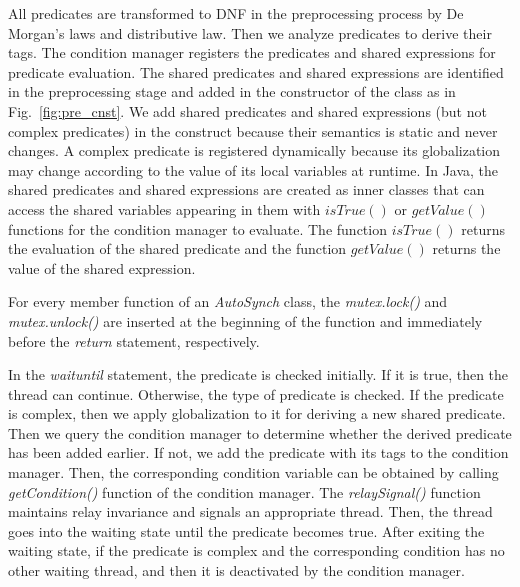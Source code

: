 \documentclass[preprint]{sigplanconf}
\begin{document}
All predicates are transformed to DNF in the preprocessing process by De Morgan's laws and 
distributive law. Then we analyze predicates to derive their tags. The condition 
manager registers the predicates and shared expressions for predicate 
evaluation. 
The shared 
predicates and shared expressions are identified in the preprocessing stage and added 
in the constructor of the class as in Fig.~\ref{fig:pre_cnst}. We add shared
predicates and shared expressions (but not complex predicates) in the construct because their semantics is
static and never changes. A complex predicate is registered dynamically
because its globalization may change according to the value of its local variables at
runtime. In Java, the shared 
predicates and shared expressions are created as inner classes that can access
the shared variables appearing in them with
$isTrue()$ or $getValue()$ functions for the condition manager to evaluate.
The function $isTrue()$ returns the evaluation of the shared predicate and
the function $getValue()$ returns the value of the shared expression.


For every member function of an {\em AutoSynch} class, the {\em mutex.lock()} and
{\em mutex.unlock()} are inserted at the beginning of the function and immediately before
the {\em return} statement, respectively.
%  


In the {\em waituntil} statement, the predicate is checked initially. If 
it is true, then the thread can continue. Otherwise, the type of
predicate is checked. If the predicate is complex, then we apply globalization 
to it for deriving a new shared predicate. Then we query the condition manager 
to determine
whether the derived predicate has been added earlier. If not, we add the 
predicate with its tags to the condition manager. Then, the corresponding 
condition variable can be obtained by calling {\em getCondition()} function of the
condition manager. The {\em relaySignal()} function maintains relay invariance 
and signals an appropriate thread. Then, the thread goes into the waiting state 
until the predicate becomes true. After exiting the waiting state, if the 
predicate is complex and the corresponding condition has no other 
waiting thread, and then it is deactivated by the condition manager.
\end{document}
